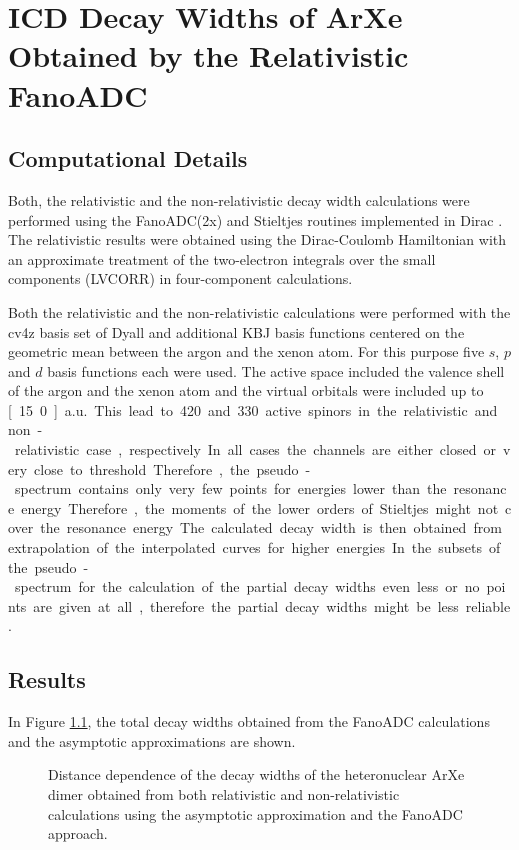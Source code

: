 \chapter{ICD Decay Widths of ArXe Obtained by the Relativistic FanoADC}
\label{chapter:fano_arxe}
\section{Computational Details}
Both, the relativistic and the non-relativistic decay width calculations
were performed using the 
FanoADC(2x) and Stieltjes routines implemented in Dirac \cite{DIRAC13}.
The relativistic results were obtained using the
Dirac-Coulomb Hamiltonian with an approximate treatment of the two-electron
integrals over the small components (LVCORR)
in four-component calculations.

Both the relativistic and the non-relativistic calculations were performed
with the cv4z basis set of Dyall \cite{dyall5p06} and
additional \ac{KBJ} \cite{Kaufmann89}
basis functions centered on the geometric mean between the argon and the xenon
atom. For this purpose five $s$, $p$ and $d$ basis functions each were used.
The active space included the valence shell of the argon and the xenon atom and
the virtual orbitals were included up to \unit[15.0]{a.u.}. 
This lead to 420 and 330 active spinors in the relativistic and non-relativistic
case, respectively.

In all cases the channels are either closed or very close to threshold.
Therefore, the pseudo-spectrum contains only very few points for energies
lower than the resonance energy. Therefore, the moments of the lower orders of
Stieltjes might not cover the resonance energy. The calculated decay width
is then obtained from extrapolation of the interpolated curves for higher energies.
In the subsets of the pseudo-spectrum for the
calculation of the partial decay widths even less or no points are given at all,
therefore the partial decay widths might be less reliable.


\section{Results}
In Figure \ref{figure:arxe_gamma_shift_fano}, the total decay widths obtained
from the FanoADC calculations and the asymptotic approximations are shown.

\begin{figure}[]
  \centering
  
  \caption{Distance dependence of the decay widths of the heteronuclear
           ArXe dimer obtained from both relativistic and non-relativistic
           calculations using the asymptotic approximation and the FanoADC
           approach.}
  \label{figure:arxe_gamma_shift_fano}
\end{figure}

